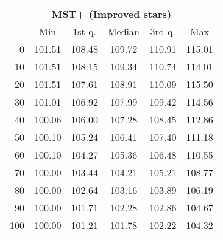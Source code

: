 \begin{tabular}{r|ccccc}
  \multicolumn{6}{c}{{\bf MST+ (Improved stars)}} \\
  & Min & 1st q. & Median & 3rd q. & Max \\ \hline\hline
  0 & 101.51 & 108.48 & 109.72 & 110.91 & 115.01
\\ 10 & 101.51 & 108.15 & 109.34 & 110.74 & 114.01
\\ 20 & 101.51 & 107.61 & 108.91 & 110.09 & 115.50
\\ 30 & 101.01 & 106.92 & 107.99 & 109.42 & 114.56
\\ 40 & 100.06 & 106.00 & 107.28 & 108.45 & 112.86
\\ 50 & 100.10 & 105.24 & 106.41 & 107.40 & 111.18
\\ 60 & 100.10 & 104.27 & 105.36 & 106.48 & 110.55
\\ 70 & 100.00 & 103.44 & 104.21 & 105.21 & 108.77
\\ 80 & 100.00 & 102.64 & 103.16 & 103.89 & 106.19
\\ 90 & 100.00 & 101.71 & 102.28 & 102.86 & 104.67
\\ 100 & 100.00 & 101.21 & 101.78 & 102.22 & 104.32
\end{tabular}

